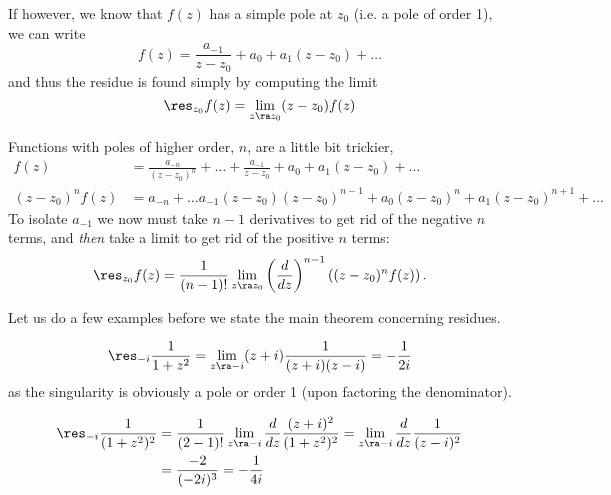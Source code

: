 If however, we know that $f(z)$ has a simple pole at $z_0$ (i.e. a pole of order 1), we can write
\[f(z)=\frac{a_{-1}}{z-z_0}+a_0+a_1(z-z_0)+\dots\]
and thus the residue is found simply by computing the limit
\[\res_{z_0}f(z)=\lim_{z\ra z_0}(z-z_0)f(z)\]

Functions with poles of higher order, $n$, are a little bit trickier,
\begin{align*}
    f(z)&=\frac{a_{-n}}{(z-z_0)^n}+\dots+\frac{a_{-1}}{z-z_0}+a_0+a_1(z-z_0)+\dots\\
    (z-z_0)^nf(z)&=a_{-n}+\dots a_{-1}(z-z_0)(z-z_0)^{n-1}+a_0(z-z_0)^n+a_1(z-z_0)^{n+1}+\dots
\end{align*}
To isolate $a_{-1}$ we now must take $n-1$ derivatives to get rid of the negative $n$ terms, and \textit{then} take a limit to get rid
of the positive $n$ terms:
\begin{align*}
    \res_{z_0} f(z)=\frac{1}{(n-1)!}\lim_{z\ra z_0}\left( \frac{d}{dz} \right)^{n-1}\left( (z-z_0)^nf(z) \right).
\end{align*}

Let us do a few examples before we state the main theorem concerning residues.
\begin{ex}
    \begin{align*}
        \res_{-i}\frac{1}{1+z^2}=\lim_{z\ra -i}(z+i)\frac{1}{(z+i)(z-i)}=-\frac{1}{2 i}
    \end{align*}
    as the singularity is obviously a pole or order 1 (upon factoring the denominator).
\end{ex}

\begin{ex}
    \begin{align*}
        \res_{-i}\frac{1}{(1+z^2)^2}&=\frac{1}{(2-1)!}\lim_{z\ra -i}\frac{d}{dz}\frac{(z+i)^2}{(1+z^2)^2}=\lim_{z\ra -i}\frac{d}{dz}\frac{1}{(z-i)^2}\\
        &=\frac{-2}{(-2i)^3}=-\frac{1}{4i}
    \end{align*}
\end{ex}


